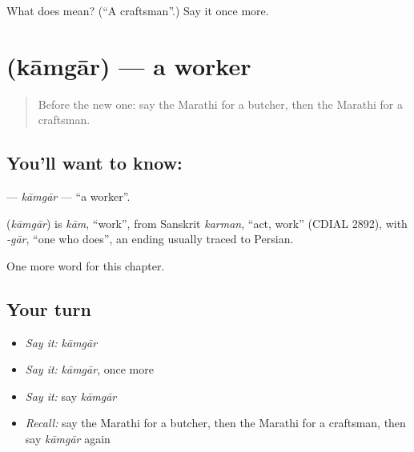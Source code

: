 \begin{tcolorbox}[breakable,colback=teal!4,colframe=teal!35!black,title={Before you move on}]
What does  mean? (\textquotedblleft{}A craftsman\textquotedblright{}.) Say it once more.
\end{tcolorbox}
\section[\texorpdfstring{\mr{कामगार} (kāmgār)}{कामगार (kāmgār)}]{ (kāmgār) — a worker}

\label{lesson:MR-C210-kamgar}



\begin{quote}
Before the new one: say the Marathi for a butcher, then the Marathi for a craftsman.
\end{quote}

\subsection*{You'll want to know: }
\textbf{} — \emph{kāmgār} — \textquotedblleft{}a worker\textquotedblright{}.

\begin{cousinweb}
\textbf{} (\emph{kāmgār}) is \emph{kām}, \textquotedblleft{}work\textquotedblright{}, from Sanskrit \emph{karman}, \textquotedblleft{}act, work\textquotedblright{} (CDIAL 2892), with \emph{-gār}, \textquotedblleft{}one who does\textquotedblright{}, an ending usually traced to Persian.
\end{cousinweb}

\begin{grammarlens}[title={What you've built}]
One more word for this chapter.
\end{grammarlens}

\subsection*{Your turn}
\begin{itemize}
\raggedright
  \item \emph{Say it:} \emph{kāmgār}
  \item \emph{Say it:} \emph{kāmgār}, once more
  \item \emph{Say it:} say \emph{kāmgār}
  \item \emph{Recall:} say the Marathi for a butcher, then the Marathi for a craftsman, then say \emph{kāmgār} again
\end{itemize}

